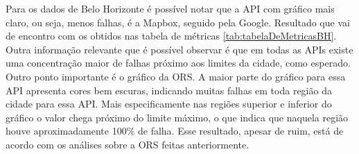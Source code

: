 Para os dados de Belo Horizonte é possível notar que a API com gráfico mais claro, ou seja, menos falhas, é a Mapbox, seguido pela Google. Resultado que vai de encontro com os obtidos nas tabela de métricas \ref{tab:tabelaDeMetricasBH}. Outra informação relevante que é possível observar é que em todas as APIs existe uma concentração maior de falhas próximo aos limites da cidade, como esperado. Outro ponto importante é o gráfico da ORS. A maior parte do gráfico para essa API apresenta cores bem escuras, indicando muitas falhas em toda região da cidade para essa API. Mais especificamente nas regiões superior e inferior do gráfico o valor chega próximo do limite máximo, o que indica que naquela região houve aproximadamente 100\% de falha. Esse resultado, apesar de ruim, está de acordo com os análises sobre a ORS feitas anteriormente. 

